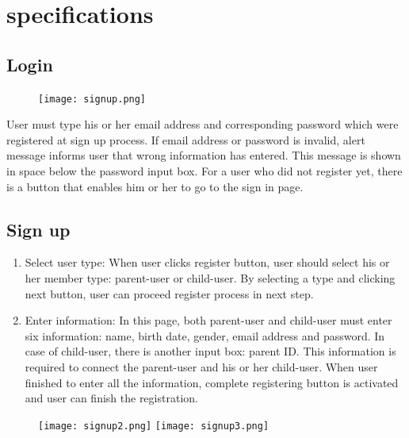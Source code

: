 \documentclass[conference]{IEEEtran}
\begin{document}
\section{\large{specifications}}

\subsection{Login}
\begin{figure}[H]
    \centering
    \texttt{[image: signup.png]}
    \end{figure}
    User must type his or her email address and corresponding password which were registered at sign up process. If email address or password is invalid, alert message informs user that wrong information has entered. This message is shown in space below the password input box. For a user who did not register yet, there is a button that enables him or her to go to the sign in page.
    
\subsection{Sign up}
    \begin{enumerate}
    \item Select user type: When user clicks register button, user should select his or her member type: parent-user or child-user. By selecting a type and clicking next button, user can proceed register process in next step.
    \item Enter information: In this page, both parent-user and child-user must enter six information: name, birth date, gender, email address and password. In case of child-user, there is another input box: parent ID. This information is required to connect the parent-user and his or her child-user. When user finished to enter all the information, complete registering button is activated and user can finish the registration.
    \end{enumerate}
    \begin{figure}[H]
    \centering
    \texttt{[image: signup2.png]}
    \texttt{[image: signup3.png]}
    \end{figure}
    
\end{document}
